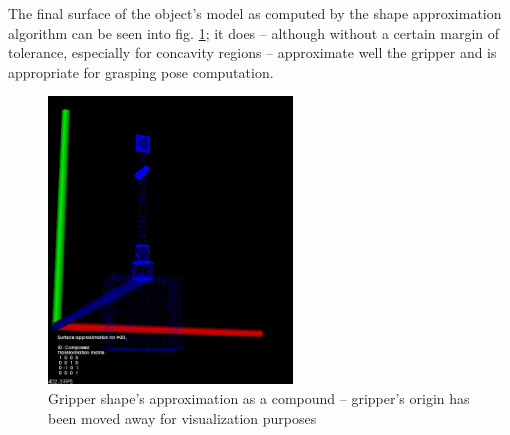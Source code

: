 The final surface of the object's model as computed by the shape approximation
algorithm can be seen into fig. \ref{fig:approximation-of-gripper}; it does --
although without a certain margin of tolerance, especially for concavity
regions -- approximate well the gripper and is appropriate for grasping pose
computation.

\begin{figure}[htbp]
\centering
\includegraphics[height=3in]{./Results/Gripper_approx}
\caption{Gripper shape's approximation as a compound -- gripper's origin has
been moved away for visualization purposes \label{fig:approximation-of-gripper}}
\end{figure}


